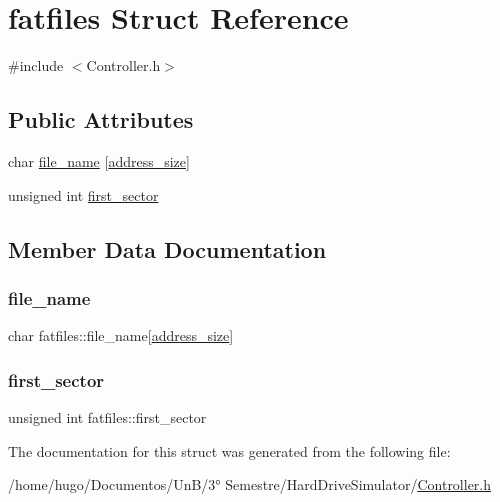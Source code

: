 \hypertarget{structfatfiles}{}\section{fatfiles Struct Reference}
\label{structfatfiles}


{\ttfamily \#include $<$Controller.\+h$>$}

\subsection*{Public Attributes}
\begin{DoxyCompactItemize}
\item 
char \hyperlink{structfatfiles_acc684980bbf1675f40b653eb6e85e653}{file\+\_\+name} \mbox{[}\hyperlink{Controller_8h_aed6ac0701172f7249ce45b4509f205cd}{address\+\_\+size}\mbox{]}
\item 
unsigned int \hyperlink{structfatfiles_aaa7d675d75e76f1eab7c5091eab0ca7d}{first\+\_\+sector}
\end{DoxyCompactItemize}


\subsection{Member Data Documentation}
\mbox{\label{structfatfiles_acc684980bbf1675f40b653eb6e85e653}} 
\subsubsection{\texorpdfstring{file\+\_\+name}{file\_name}}
{\footnotesize\ttfamily char fatfiles\+::file\+\_\+name\mbox{[}\hyperlink{Controller_8h_aed6ac0701172f7249ce45b4509f205cd}{address\+\_\+size}\mbox{]}}

\mbox{\label{structfatfiles_aaa7d675d75e76f1eab7c5091eab0ca7d}} 
\subsubsection{\texorpdfstring{first\+\_\+sector}{first\_sector}}
{\footnotesize\ttfamily unsigned int fatfiles\+::first\+\_\+sector}



The documentation for this struct was generated from the following file\+:\begin{DoxyCompactItemize}
\item 
/home/hugo/\+Documentos/\+Un\+B/3° Semestre/\+Hard\+Drive\+Simulator/\hyperlink{Controller_8h}{Controller.\+h}\end{DoxyCompactItemize}
